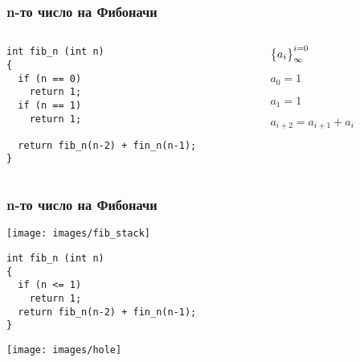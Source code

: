 \documentclass{beamer}
\begin{document}
\begin{frame}[fragile]
\frametitle{n-то число на Фибоначи}


\begin{columns}[t]
  \begin{column}{0.7\textwidth}

\begin{lstlisting}
int fib_n (int n)
{
  if (n == 0)
    return 1;
  if (n == 1)
    return 1;

  return fib_n(n-2) + fin_n(n-1);
}
\end{lstlisting}


  \end{column}
  \begin{column}{0.3\textwidth}
\begin{flushleft}

  $\big{\{}a_i\big{\}}_\infty^{i=0}$

  \vspace{10px}

  $a_0 = 1$

  $a_1 = 1$

  $a_{i+2} = a_{i+1} + a_i$


\end{flushleft}
  \end{column}
\end{columns}

\end{frame}



\begin{frame}[fragile]
\frametitle{n-то число на Фибоначи}

\texttt{[image: images/fib\_stack]}

\vspace{-100px}

\begin{flushleft}
\begin{lstlisting}
int fib_n (int n)
{
  if (n <= 1)
    return 1;
  return fib_n(n-2) + fin_n(n-1);
}
\end{lstlisting}  
\end{flushleft}


\end{frame}

\begin{frame}
\begin{center}
   \texttt{[image: images/hole]}
\end{center}

\end{frame}
\end{document}
